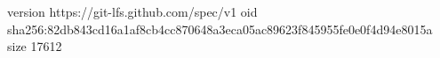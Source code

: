 version https://git-lfs.github.com/spec/v1
oid sha256:82db843cd16a1af8cb4cc870648a3eca05ac89623f845955fe0e0f4d94e8015a
size 17612
